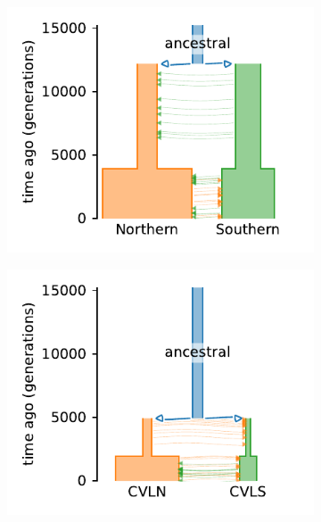 \begin{figure}[ht]
    \centering
    \begin{subfigure}[b]{.33\textwidth}
    \includegraphics[width=\textwidth]{images_experiments/gaboon_forest_frog/auto/picture_1pop_model_nor_sou.pdf}
    \label{fig:part3:experiments:frog:results_1}
    \end{subfigure}%
    \begin{subfigure}[b]{.33\textwidth}
    \includegraphics[width=\textwidth]{images_experiments/gaboon_forest_frog/auto/picture_1pop_model_cvln_cvls.pdf}
    \label{fig:part3:experiments:frog:results_2}

\end{subfigure}
\end{figure}
